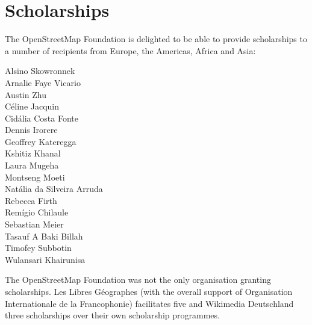 \newpage
\section*{Scholarships}
\label{scholarships}
\pagestyle{cropmarksstyle}

The OpenStreetMap Foundation is delighted to be able to provide scholarships to a number of
recipients from Europe, the Americas, Africa and Asia:

\RaggedRight
\begin{multicols}{2}
  Alsino Skowronnek\\
  Arnalie Faye Vicario\\
  Austin Zhu\\
  Céline Jacquin\\
  Cidália Costa Fonte\\
  Dennis Irorere\\
  Geoffrey Kateregga\\
  Kshitiz Khanal\\
  Laura Mugeha\\
  Montseng Moeti\\
  Natália da Silveira Arruda\\
  Rebecca Firth\\
  Remígio Chilaule\\
  Sebastian Meier\\
  Tasauf A Baki Billah\\
  Timofey Subbotin\\
  Wulansari Khairunisa\\
\end{multicols}
\justifying

The OpenStreetMap Foundation was not the only organisation granting scholarships. Les Libres
Géographes (with the overall support of Organisation Internationale de la Francophonie) facilitates five and Wikimedia Deutschland three scholarships over their own scholarship programmes.
